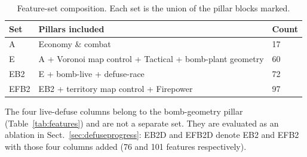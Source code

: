 \documentclass[11pt,a4paper]{article}
\begin{document}
\begin{table}[H]
\centering
\caption{Feature-set composition. Each set is the union of the pillar blocks marked.}
\label{tab:featuresets}
\small
\begin{tabular}{lll}
\toprule
Set & Pillars included & Count \\
\midrule
A     & Economy \& combat & 17 \\
E     & A + Voronoi map control + Tactical + bomb-plant geometry & 60 \\
EB2   & E + bomb-live + defuse-race & 72 \\
EFB2  & EB2 + territory map control + Firepower & 97 \\
\bottomrule
\end{tabular}
\end{table}

\noindent The four live-defuse columns belong to the bomb-geometry pillar (Table~\ref{tab:features})
and are not a separate set. They are evaluated as an ablation in Sect.~\ref{sec:defuseprogress}: EB2D
and EFB2D denote EB2 and EFB2 with those four columns added (76 and 101 features respectively).
\end{document}
